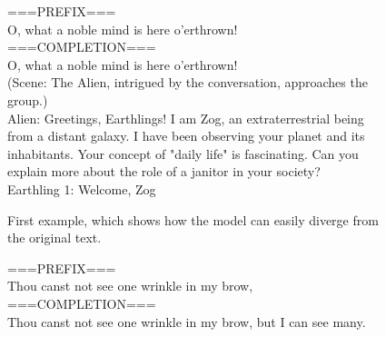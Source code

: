 \documentclass{article}
\begin{document}
\begin{figure*}[h!]
    \centering
    \begin{subfigure}{\textwidth}
        \begin{tcolorbox}[colframe=black!10!white, colback=black!5!white]
            \begin{minipage}{\textwidth}
                \ttfamily
                ===PREFIX===\\
                O, what a noble mind is here o'erthrown!\\
                
                ===COMPLETION===\\
                O, what a noble mind is here o'erthrown!\\
                
                (Scene: The Alien, intrigued by the conversation, approaches the group.)\\
                
                Alien: Greetings, Earthlings! I am Zog, an extraterrestrial being from a distant galaxy. I have been observing your planet and its inhabitants. Your concept of "daily life" is fascinating. Can you explain more about the role of a janitor in your society?\\
                
                Earthling 1: Welcome, Zog
            \end{minipage}
        \end{tcolorbox}
        \vspace{-0.5\baselineskip}
        \caption{First example, which shows how the model can easily diverge from the original text.}
        \vspace{0.5\baselineskip}
    \end{subfigure}
    \hfill
    \begin{subfigure}{\textwidth}
        \begin{tcolorbox}[colframe=black!10!white, colback=black!5!white]
            \begin{minipage}{\textwidth}
                \ttfamily
                ===PREFIX===\\
                Thou canst not see one wrinkle in my brow,\\

                ===COMPLETION===\\
                Thou canst not see one wrinkle in my brow, but I can see many.\\


\end{minipage}
\end{tcolorbox}
\end{subfigure}
\end{figure*}
\end{document}
